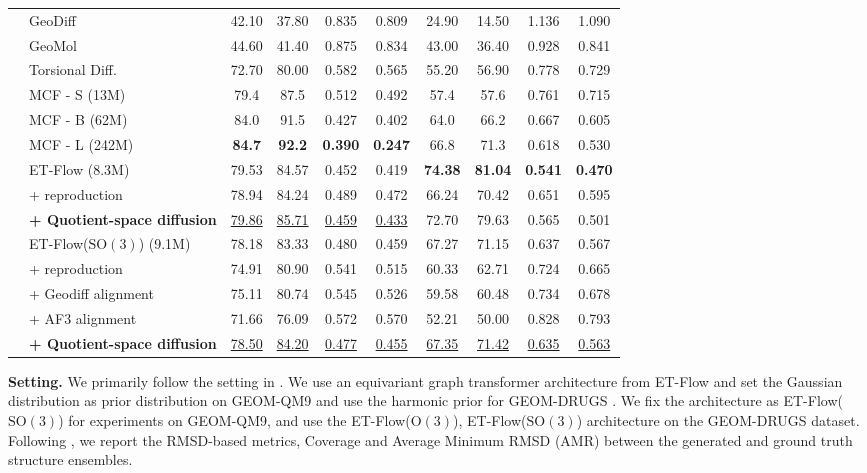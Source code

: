 \documentclass{article} %
\newcommand{\SO}{\mathrm{SO}}
\begin{document}
\begin{table}[t]
{\begin{tabular}{clcccccccc}
\midrule
{}
& GeoDiff & 42.10 & 37.80 & 0.835 & 0.809 & 24.90 & 14.50 & 1.136 & 1.090 \\
& GeoMol & 44.60 & 41.40 & 0.875 & 0.834 & 43.00 & 36.40 & 0.928 & 0.841 \\
& Torsional Diff. & 72.70 & 80.00 & 0.582 & 0.565 & 55.20 & 56.90 & 0.778 & 0.729 \\
& MCF - S (13M) & 79.4 & 87.5 & 0.512 & 0.492 & 57.4 & 57.6 & 0.761 & 0.715 \\
& MCF - B (62M) & 84.0 & 91.5 & 0.427 & 0.402 & 64.0 & 66.2 & 0.667 & 0.605 \\
& MCF - L (242M) & \textbf{84.7} & \textbf{92.2} & \textbf{0.390} & \textbf{0.247} & 66.8 & 71.3 & 0.618 & 0.530 \\
& ET-Flow (8.3M) & 79.53 & 84.57 & 0.452 & 0.419 & \textbf{74.38} & \textbf{81.04} & \textbf{0.541} & \textbf{0.470} \\
& + reproduction& 78.94 & 84.24  & 0.489 & 0.472 & 66.24 & 70.42 & 0.651 & 0.595 \\
& \textbf{+ Quotient-space diffusion} & \underline{79.86} & \underline{85.71} &\underline{0.459} &\underline{0.433} & 72.70 & 79.63 & 0.565 & 0.501 \\
& ET-Flow($\SO(3)$) (9.1M) & 78.18 & 83.33 & 0.480 & 0.459 & 67.27 & 71.15 & 0.637 & 0.567 \\
& + reproduction & 74.91 & 80.90 &	0.541&	0.515 	& 60.33	& 62.71	&0.724	& 0.665 \\
& + Geodiff alignment & 75.11& 80.74& 0.545&0.526 & 59.58&60.48 & 0.734&0.678 \\
& + AF3 alignment & 71.66 & 76.09 & 0.572& 0.570& 52.21 & 50.00&0.828 &0.793 \\
& \textbf{+ Quotient-space diffusion} & \underline{78.50} & \underline{84.20}&\underline{0.477} & \underline{0.455}& \underline{67.35} & \underline{71.42}&\underline{0.635} & \underline{0.563}\\
\bottomrule
\end{tabular}%
}
\vspace{-10pt}
\end{table}

\textbf{Setting.} We primarily follow the setting in \citet{hassan2024flow}. We use an equivariant graph transformer architecture from ET-Flow \citep{hassan2024flow} and set the Gaussian distribution as prior distribution on GEOM-QM9 and use the harmonic prior for GEOM-DRUGS \citep{volk2023alphaflow}. We fix the architecture as ET-Flow($\SO(3)$) for experiments on GEOM-QM9, and use the ET-Flow($\text{O}(3)$), ET-Flow($\SO(3)$) architecture on the GEOM-DRUGS dataset. Following \citet{jing2022torsional,xu2022geodiff}, we report the RMSD-based metrics, \eg Coverage and Average Minimum RMSD (AMR) between the generated and ground truth structure ensembles.
\end{document}
